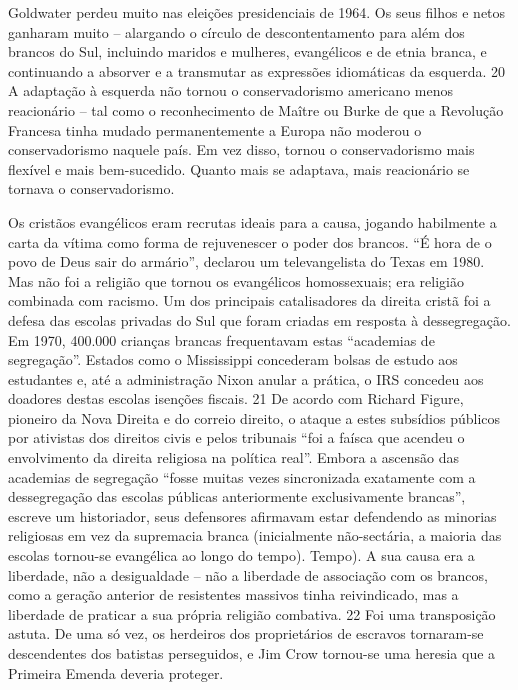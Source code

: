 \par
 
Goldwater perdeu muito nas eleições presidenciais de 1964. Os seus filhos e netos ganharam muito – alargando o círculo de descontentamento para além dos brancos do Sul, incluindo maridos e mulheres, evangélicos e de etnia branca, e continuando a absorver e a transmutar as expressões idiomáticas da esquerda.
 {\color{blue} 20}  
A adaptação à esquerda não tornou o conservadorismo americano menos reacionário – tal como o reconhecimento de Maître ou Burke de que a Revolução Francesa tinha mudado permanentemente a Europa não moderou o conservadorismo naquele país. Em vez disso, tornou o conservadorismo mais flexível e mais bem-sucedido. Quanto mais se adaptava, mais reacionário se tornava o conservadorismo.
 
\par
 
Os cristãos evangélicos eram recrutas ideais para a causa, jogando habilmente a carta da vítima como forma de rejuvenescer o poder dos brancos. “É hora de o povo de Deus sair do armário”, declarou um televangelista do Texas em 1980. Mas não foi a religião que tornou os evangélicos homossexuais; era religião combinada com racismo. Um dos principais catalisadores da direita cristã foi a defesa das escolas privadas do Sul que foram criadas em resposta à dessegregação. Em 1970, 400.000 crianças brancas frequentavam estas “academias de segregação”. Estados como o Mississippi concederam bolsas de estudo aos estudantes e, até a administração Nixon anular a prática, o IRS concedeu aos doadores destas escolas isenções fiscais.
 {\color{blue} 21}  
De acordo com Richard Figure, pioneiro da Nova Direita e do correio direito, o ataque a estes subsídios públicos por ativistas dos direitos civis e pelos tribunais “foi a faísca que acendeu o envolvimento da direita religiosa na política real”. Embora a ascensão das academias de segregação “fosse muitas vezes sincronizada exatamente com a dessegregação das escolas públicas anteriormente exclusivamente brancas”, escreve um historiador, seus defensores afirmavam estar defendendo as minorias religiosas em vez da supremacia branca (inicialmente não-sectária, a maioria das escolas tornou-se evangélica ao longo do tempo). Tempo). A sua causa era a liberdade, não a desigualdade – não a liberdade de associação com os brancos, como a geração anterior de resistentes massivos tinha reivindicado, mas a liberdade de praticar a sua própria religião combativa.
 {\color{blue} 22}  
Foi uma transposição astuta. De uma só vez, os herdeiros dos proprietários de escravos tornaram-se descendentes dos batistas perseguidos, e Jim Crow tornou-se uma heresia que a Primeira Emenda deveria proteger.
 
